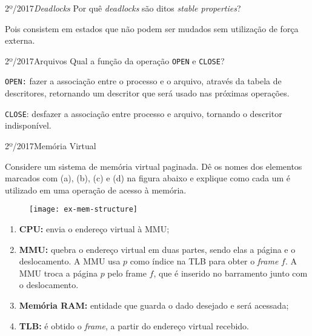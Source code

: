 \begin{exercicio}
  {2º/2017}{\textit{Deadlocks}}
  {Por quê \textit{deadlocks} são ditos \textit{stable properties}?}

  Pois consistem em estados que não podem ser mudados sem utilização de força externa.
\end{exercicio}

\begin{exercicio}
  {2º/2017}{Arquivos}
  {Qual a função da operação \texttt{OPEN} e \texttt{CLOSE}?}

  \texttt{OPEN:} fazer a associação entre o processo e o arquivo, através da tabela de descritores, retornando um descritor que será usado nas próximas operações.

  \texttt{CLOSE}: desfazer a associação entre processo e arquivo, tornando o descritor indisponível.
\end{exercicio}

\begin{exercicio}
  {2º/2017}{Memória Virtual}
  {
    Considere um sistema de memória virtual paginada. Dê os nomes dos elementos marcados com (a), (b), (c) e (d) na figura abaixo e explique como cada um é utilizado em uma operação de acesso à memória.
    \begin{figure}[H]
      \centering
      \texttt{[image: ex-mem-structure]}
    \end{figure}
  }

  \begin{enumerate}[label=(\alph*)]
    \item \textbf{CPU:} envia o endereço virtual à MMU;

    \item \textbf{MMU:} quebra o endereço virtual em duas partes, sendo elas a página e o deslocamento. A MMU usa $p$ como índice na TLB para obter o \textit{frame} $f$. A MMU troca a página $p$ pelo frame $f$, que é inserido no barramento junto com o deslocamento.

    \item \textbf{Memória RAM:} entidade que guarda o dado desejado e será acessada;

    \item \textbf{TLB:} é obtido o \textit{frame}, a partir do endereço virtual recebido.
  \end{enumerate}
\end{exercicio}


